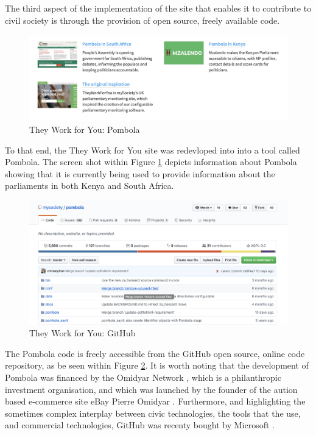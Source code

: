 The third aspect of the implementation of the site that enables it to contribute to civil society is through the provision of open source, freely available code.

\begin{figure}[h]
  \centering
  \includegraphics[scale=0.3]{images/they-work-for-you-implementation-open-source-pombola}
  \caption{They Work for You: Pombola}
  \label{fig:they-work-for-you-implementation-open-source-pombola}
\end{figure}

To that end, the They Work for You site was redevloped into into a tool called Pombola.
The screen shot within Figure \ref{fig:they-work-for-you-implementation-open-source-pombola} depicts information about Pombola showing that it is currently being used to provide information about the parliaments in both Kenya and South Africa.

\begin{figure}[h]
  \centering
  \includegraphics[scale=0.3]{images/they-work-for-you-implementation-open-source-github}
  \caption{They Work for You: GitHub}
  \label{fig:they-work-for-you-implementation-open-source-github}
\end{figure}

The Pombola code \cite{mysociety-github} is freely accessible from the GitHub \cite{github} open source, online code repository, as be seen within Figure \ref{fig:they-work-for-you-implementation-open-source-github}.
It is worth noting that the development of Pombola was financed by the Omidyar Network \cite{omidyar-network}, which is a philanthropic investment organisation, and which was launched by the founder of the aution based e-commerce site eBay \cite{ebay} Pierre Omidyar \cite{pierre-omidyar}.
Furthermore, and highlighting the sometimes complex interplay between civic technologies, the tools that the use, and commercial technologies, GitHub was recenty bought by Microsoft \cite{microsoft-buys-github}.
